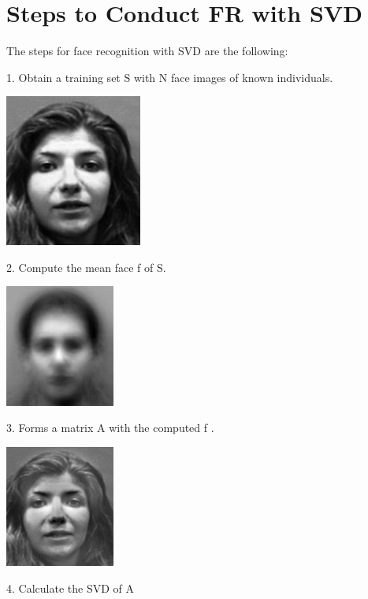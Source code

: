 \section{Steps to Conduct FR with SVD}
The steps for face recognition with SVD are the following:\par
1. Obtain a  training  set S with N face 
images of known individuals.\par
\begin{center}  
	\includegraphics[height=5cm]{dataset_img.jpg}
\end{center}
2. Compute the mean face f of S.\par
\begin{center}  
	\includegraphics[height=4cm]{mean_img.jpg}
\end{center}
3. Forms a  matrix A with the 
computed f .\par
\begin{center}  
	\includegraphics[height=4cm]{diff_img.jpg}
\end{center}
4. Calculate the SVD of A\par
